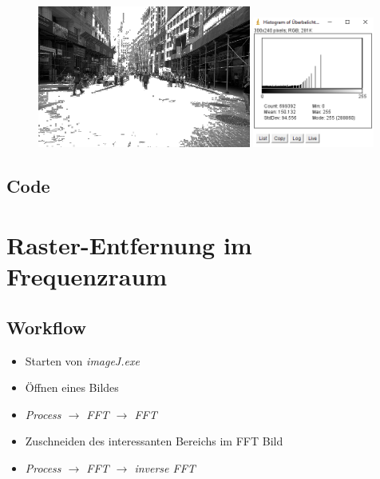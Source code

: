 \documentclass[12pt,german]{article}
\begin{document}
\begin{figure}[h!] \centering
	\includegraphics[width=7cm]{../testData/Results/Ueberbelichtung/Ueberbelichtung-equalized.jpg}
	\includegraphics[width=4cm]{../testData/Results/Ueberbelichtung/Ueberbelichtung-equalized-histogram.png}
\end{figure}
\pagebreak
\subsection{Code}




\newpage
\section{ Raster-Entfernung im Frequenzraum}
\subsection{Workflow}
\begin{itemize}
	\item Starten von \textit{imageJ.exe}
	\item Öffnen eines Bildes
	\item \textit{Process $\rightarrow$ FFT $\rightarrow$ FFT}
	\item Zuschneiden des interessanten Bereichs im FFT Bild
	\item \textit{Process $\rightarrow$ FFT $\rightarrow$ inverse FFT}
\end{itemize}
\end{document}
